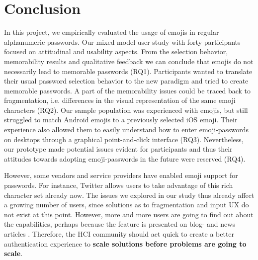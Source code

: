



\section{Conclusion}
In this project, we empirically evaluated the usage of emojis in regular alphanumeric passwords. Our mixed-model user study with forty participants focused on attitudinal and usability aspects. From the selection behavior, memorability results and qualitative feedback we can conclude that emojis do not necessarily lead to memorable passwords (RQ1). Participants wanted to translate their usual password selection behavior to the new paradigm and tried to create memorable passwords. A part of the memorability issues could be traced back to fragmentation, i.e. differences in the visual representation of the same emoji characters (RQ2). Our sample population was experienced with emojis, but still struggled to match Android emojis to a previously selected iOS emoji. Their experience also allowed them to easily understand how to enter emoji-passwords on desktops through a graphical point-and-click interface (RQ3). Nevertheless, our prototype made potential issues evident for participants and thus their attitudes towards adopting emoji-passwords in the future were reserved (RQ4). 

However, some vendors and service providers have enabled emoji support for passwords. For instance, Twitter allows users to take advantage of this rich character set already now. The issues we explored in our study thus already affect a growing number of users, since solutions as to fragmentation and input UX do not exist at this point. However, more and more users are going to find out about the capabilities, perhaps because the feature is presented on blog- and news articles \cite{Dashinsky2015NoEmojisInPWs}. Therefore, the HCI community should act quick to create a better authentication experience to \textbf{scale solutions before problems are going to scale}. 

